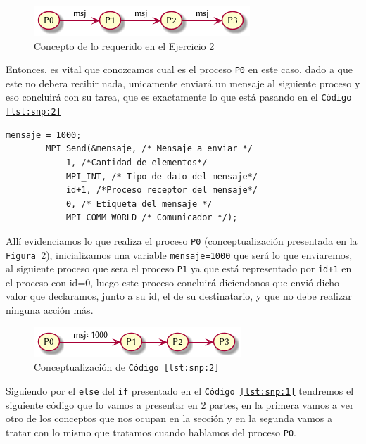 \documentclass{article}
\begin{document}
\begin{figure}[H]
  \centering
  \includegraphics[width=.4\linewidth]{EJ2}
  \caption{Concepto de lo requerido en el Ejercicio 2}
  \label{fig:conej2}
\end{figure}

Entonces, es vital que conozcamos cual es el proceso \texttt{P0} en este caso,
dado a que este no debera recibir nada, unicamente enviar\'a un mensaje al
siguiente proceso y eso concluir\'a con su tarea, que es exactamente lo que
est\'a pasando en el \texttt{C\'odigo \ref{lst:snp:2}}

\begin{lstlisting}[caption={MPI\_Send para P0 - Fragmento de \texttt{C\'odigo \ref{lst:mpi2}}},
label=lst:snp:2, firstnumber=19]
		mensaje = 1000;
		MPI_Send(&mensaje, /* Mensaje a enviar */
			1, /*Cantidad de elementos*/
			MPI_INT, /* Tipo de dato del mensaje*/
			id+1, /*Proceso receptor del mensaje*/
			0, /* Etiqueta del mensaje */
			MPI_COMM_WORLD /* Comunicador */);
\end{lstlisting}

All\'i evidenciamos lo que realiza el proceso \texttt{P0} (conceptualizaci\'on
presentada en la \texttt{Figura \ref{fig:conej2_1}}), inicializamos una
variable \texttt{mensaje=1000} que ser\'a lo que enviaremos, al siguiente
proceso que sera el proceso \texttt{P1} ya que est\'a representado por
\texttt{id+1} en el proceso con id=0, luego este proceso concluir\'a
diciendonos que envi\'o dicho valor que declaramos, junto a su id, el de su destinatario, y que no
debe realizar ninguna acci\'on m\'as.

\begin{figure}[H]
  \centering
  \includegraphics[width=.4\linewidth]{EJ2_001}
  \caption{Conceptualizaci\'on de \texttt{C\'odigo \ref{lst:snp:2}}}
  \label{fig:conej2_1}
\end{figure}

Siguiendo por el \texttt{else} del \texttt{if} presentado en el
\texttt{C\'odigo \ref{lst:snp:1}} tendremos el  siguiente c\'odigo que lo vamos
a presentar en 2 partes, en la primera vamos a ver otro de los conceptos que nos
ocupan en la secci\'on y en la segunda vamos a tratar con lo mismo que tratamos
cuando hablamos del proceso \texttt{P0}.
\end{document}
